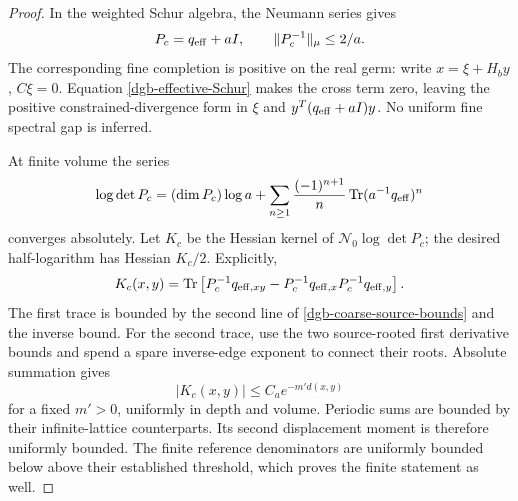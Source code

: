 \begin{proof}
In the weighted Schur algebra, the Neumann series gives
\begin{equation}
 P_c=q_{\rm eff}+aI,\qquad
                         \|P_c^{-1}\|_\mu\leq 2/a.
 \label{dgb-coarse-inverse}
\end{equation}
The corresponding fine completion is positive on the
real germ: write $x=\xi+H_by$, $C\xi=0$.
Equation \eqref{dgb-effective-Schur} makes the cross term
zero, leaving the positive constrained-divergence form
in $\xi$ and $y^T(q_{\rm eff}+aI)y$.
No uniform fine spectral gap is inferred.

At finite volume the series
\begin{equation}
 \log\det P_c
   =(\dim P_c)\log a+
      \sum_{n\geq1}\frac{(-1)^{n+1}}n
                \operatorname{Tr}(a^{-1}q_{\rm eff})^n
 \label{dgb-coarse-log-series}
\end{equation}
converges absolutely. Let $K_c$ be the Hessian kernel of
$\mathcal N_0\log\det P_c$; the desired half-logarithm
has Hessian $K_c/2$. Explicitly,
\begin{equation}
 K_c(x,y)=\operatorname{Tr}\left[
       P_c^{-1}q_{{\rm eff},xy}
       -P_c^{-1}q_{{\rm eff},x}
                   P_c^{-1}q_{{\rm eff},y}\right].
 \label{dgb-coarse-trace}
\end{equation}
The first trace is bounded by the second line of
\eqref{dgb-coarse-source-bounds} and the inverse bound.
For the second trace, use the two source-rooted first
derivative bounds and spend a spare inverse-edge
exponent to connect their roots. Absolute summation gives
\begin{equation}
                            |K_c(x,y)|
                                \leq C_a e^{-m'd(x,y)}
 \label{dgb-coarse-Hessian-decay}
\end{equation}
for a fixed $m'>0$, uniformly in depth and volume.
Periodic sums are bounded by their infinite-lattice
counterparts. Its second displacement moment is therefore
uniformly bounded. The finite reference denominators
are uniformly bounded below above their established
threshold, which proves the finite statement as well.
\end{proof}

